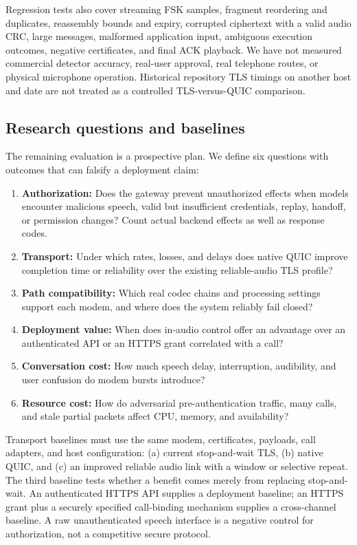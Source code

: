 Regression tests also cover streaming FSK samples, fragment reordering and
duplicates, reassembly bounds and expiry, corrupted ciphertext with a valid
audio CRC, large messages, malformed application input, ambiguous execution
outcomes, negative certificates, and final ACK playback. We have not measured
commercial detector accuracy, real-user approval, real telephone routes, or
physical microphone operation. Historical repository TLS timings on another
host and date are not treated as a controlled TLS-versus-QUIC comparison.

\subsection{Research questions and baselines}
The remaining evaluation is a prospective plan. We define six questions with
outcomes that can falsify a deployment claim:
\begin{enumerate}
\item \textbf{Authorization:} Does the gateway prevent unauthorized effects when
models encounter malicious speech, valid but insufficient credentials, replay,
handoff, or permission changes? Count actual backend effects as well as response codes.
\item \textbf{Transport:} Under which rates, losses, and delays does native QUIC
improve completion time or reliability over the existing reliable-audio TLS profile?
\item \textbf{Path compatibility:} Which real codec chains and processing settings
support each modem, and where does the system reliably fail closed?
\item \textbf{Deployment value:} When does in-audio control offer an advantage
over an authenticated API or an HTTPS grant correlated with a call?
\item \textbf{Conversation cost:} How much speech delay, interruption, audibility,
and user confusion do modem bursts introduce?
\item \textbf{Resource cost:} How do adversarial pre-authentication traffic,
many calls, and stale partial packets affect CPU, memory, and availability?
\end{enumerate}

Transport baselines must use the same modem, certificates, payloads, call
adapters, and host configuration: (a) current stop-and-wait TLS, (b) native
QUIC, and (c) an improved reliable audio link with a window or selective repeat.
The third baseline tests whether a benefit comes merely from replacing
stop-and-wait. An authenticated HTTPS API supplies a deployment baseline;
an HTTPS grant plus a securely specified call-binding mechanism supplies a
cross-channel baseline. A raw unauthenticated speech interface is a negative
control for authorization, not a competitive secure protocol.

